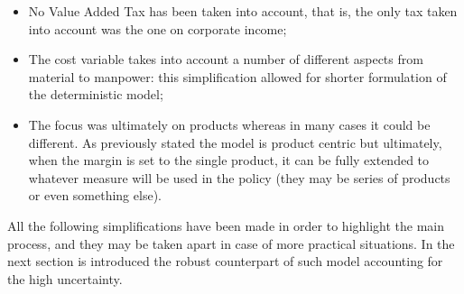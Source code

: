 \documentclass[conference,final,]{IEEEtran}
\begin{document}
\begin{itemize}
\item
  No Value Added Tax has been taken into account, that is, the only tax
  taken into account was the one on corporate income;
\item
  The cost variable takes into account a number of different aspects
  from material to manpower: this simplification allowed for shorter
  formulation of the deterministic model;
\item
  The focus was ultimately on products whereas in many cases it could be
  different. As previously stated the model is product centric but
  ultimately, when the margin is set to the single product, it can be
  fully extended to whatever measure will be used in the policy (they
  may be series of products or even something else).
\end{itemize}
All the following simplifications have been made in order to highlight the main process, and they may be taken apart in case of more practical situations. In the next section is introduced the robust counterpart of such model accounting for the high uncertainty.
\end{document}

